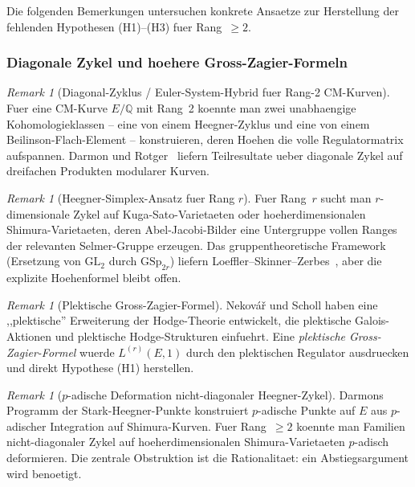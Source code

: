 \documentclass[aps,prd,twocolumn,superscriptaddress,nofootinbib]{revtex4-2}
\theoremstyle{definition}
\theoremstyle{remark}
\newtheorem{remark}[theorem]{Remark}
\begin{document}
Die folgenden Bemerkungen untersuchen konkrete Ansaetze zur Herstellung der fehlenden Hypothesen (H1)--(H3) fuer Rang~$\geq 2$.

\subsubsection{Diagonale Zykel und hoehere Gross-Zagier-Formeln}

\begin{remark}[Diagonal-Zyklus / Euler-System-Hybrid fuer Rang-2 CM-Kurven]
\label{rem:diagonal-euler}
Fuer eine CM-Kurve $E/\mathbb{Q}$ mit Rang~2 koennte man zwei unabhaengige Kohomologieklassen -- eine von einem Heegner-Zyklus und eine von einem Beilinson-Flach-Element -- konstruieren, deren Hoehen die volle Regulatormatrix aufspannen. Darmon und Rotger~\cite{DarmonRotger2017} liefern Teilresultate ueber diagonale Zykel auf dreifachen Produkten modularer Kurven.
\end{remark}

\begin{remark}[Heegner-Simplex-Ansatz fuer Rang $r$]
\label{rem:heegner-simplex}
Fuer Rang~$r$ sucht man $r$-dimensionale Zykel auf Kuga-Sato-Varietaeten oder hoeherdimensionalen Shimura-Varietaeten, deren Abel-Jacobi-Bilder eine Untergruppe vollen Ranges der relevanten Selmer-Gruppe erzeugen. Das gruppentheoretische Framework (Ersetzung von $\mathrm{GL}_2$ durch $\mathrm{GSp}_{2r}$) liefern Loeffler--Skinner--Zerbes~\cite{LSZ2020}, aber die explizite Hoehenformel bleibt offen.
\end{remark}

\begin{remark}[Plektische Gross-Zagier-Formel]
\label{rem:plectic-gz}
Nekov\'a\v{r} und Scholl haben eine ,,plektische'' Erweiterung der Hodge-Theorie entwickelt, die plektische Galois-Aktionen und plektische Hodge-Strukturen einfuehrt. Eine \textit{plektische Gross-Zagier-Formel} wuerde $L^{(r)}(E,1)$ durch den plektischen Regulator ausdruecken und direkt Hypothese (H1) herstellen.
\end{remark}

\begin{remark}[$p$-adische Deformation nicht-diagonaler Heegner-Zykel]
\label{rem:p-adic-deformation}
Darmons Programm der Stark-Heegner-Punkte konstruiert $p$-adische Punkte auf $E$ aus $p$-adischer Integration auf Shimura-Kurven. Fuer Rang~$\geq 2$ koennte man Familien nicht-diagonaler Zykel auf hoeherdimensionalen Shimura-Varietaeten $p$-adisch deformieren. Die zentrale Obstruktion ist die Rationalitaet: ein Abstiegsargument wird benoetigt.
\end{remark}
\end{document}
